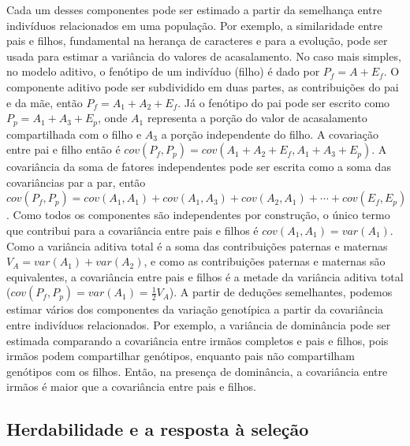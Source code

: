 \begin{refsection}
\enlargethispage{\baselineskip}
Cada um desses componentes pode ser estimado a partir da semelhança entre
indivíduos relacionados em uma população. Por exemplo, a similaridade entre
pais e filhos, fundamental na herança de caracteres e para a evolução, pode
ser usada para estimar a variância do valores de acasalamento. No caso mais
simples, no modelo aditivo, o fenótipo de um indivíduo (filho) é dado por $P_f
= A + E_f$. O componente aditivo pode ser subdividido em duas partes, as
contribuições do pai e da mãe, então $P_f = A_1 + A_2 + E_f$. Já o fenótipo do
pai pode ser escrito como $P_p = A_1 + A_3 + E_p$, onde $A_1$ representa a
porção do valor de acasalamento compartilhada com o filho e $A_3$ a porção
independente do filho. A covariação entre pai e filho então é $cov(P_f, P_p) =
cov(A_1 + A_2 + E_f, A_1 + A_3 + E_p)$. A covariância da soma de fatores
independentes pode ser escrita como a soma das covariâncias par a par, então
$cov(P_f, P_p) = cov(A_1, A_1) + cov(A_1, A_3) + cov(A_2, A_1) + \cdots  +
cov(E_f, E_p)$. Como todos os componentes são independentes por construção, o
único termo que contribui para a covariância entre pais e filhos é $cov(A_1,
A_1) = var(A_1)$. Como a variância aditiva total é a soma das contribuições
paternas e maternas $V_A = var(A_1) + var(A_2)$, e como as contribuições
paternas e maternas são equivalentes, a covariância entre pais e filhos é a
metade da variância aditiva total ($cov(P_f, P_p) = var(A_1) =
\frac{1}{2}V_A$). A partir de deduções semelhantes, podemos estimar vários dos
componentes da variação genotípica a partir da covariância entre indivíduos
relacionados. Por exemplo, a variância de dominância pode ser estimada
comparando a covariância entre irmãos completos e pais e filhos, pois irmãos
podem compartilhar genótipos, enquanto pais não compartilham genótipos com os
filhos. Então, na presença de dominância, a covariância entre irmãos é maior
que a covariância entre pais e filhos.

\subsection{Herdabilidade e a resposta à seleção}


\end{refsection}
